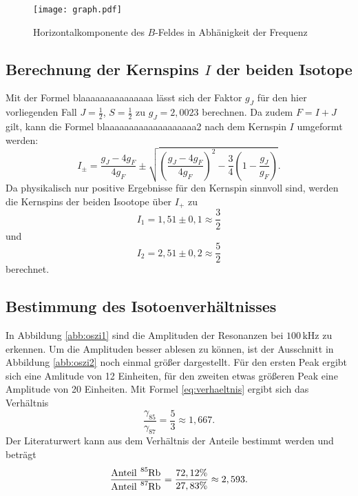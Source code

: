
\begin{figure}[H]
 \centering
 \texttt{[image: graph.pdf]}
 \caption{Horizontalkomponente des $B$-Feldes in Abhänigkeit der Frequenz}
 \label{abb:graph}
\end{figure}

\subsection{Berechnung der Kernspins $I$ der beiden Isotope}
Mit der Formel blaaaaaaaaaaaaaaa lässt sich der Faktor $g_J$ für den hier vorliegenden Fall $J=\frac{1}{2}$, $S=\frac{1}{2}$ zu $g_J=2,0023$ berechnen.
Da zudem $F=I+J$ gilt, kann die Formel blaaaaaaaaaaaaaaaaaaa2 nach dem Kernspin $I$ umgeformt werden:
\begin{equation}
I_\pm=\frac{g_J-4g_F}{4g_F}\pm \sqrt{\left(\frac{g_J-4g_F}{4g_F}\right)^2-\frac{3}{4}\left(1-\frac{g_J}{g_F}\right)}.
\end{equation}
Da physikalisch nur positive Ergebnisse für den Kernspin sinnvoll sind, werden die Kernspins der beiden Isootope über $I_+$ zu
\begin{equation}
I_1=1,51\pm0,1\approx \frac{3}{2}
\end{equation}
und
\begin{equation}
  I_2=2,51\pm0,2\approx \frac{5}{2}
\end{equation}
berechnet.

\subsection{Bestimmung des Isotoenverhältnisses}

In Abbildung \ref{abb:oszi1} sind die Amplituden der Resonanzen bei $100\,\text{kHz}$ zu erkennen. Um die Amplituden besser ablesen zu können, ist der Ausschnitt
in Abbildung \ref{abb:oszi2} noch einmal größer dargestellt. Für den ersten Peak ergibt sich eine Amlitude von 12 Einheiten, für den zweiten etwas größeren
Peak eine Amplitude von 20 Einheiten. Mit Formel \eqref{eq:verhaeltnis} ergibt sich das Verhältnis
\begin{equation}
  \frac{\gamma_{85}}{\gamma_{87}}=\frac{5}{3}\approx 1,667.
\end{equation}
Der Literaturwert kann aus dem Verhältnis\cite{isotop} der Anteile bestimmt werden und beträgt
\begin{equation}
  \frac{\text{Anteil}~ \ce{^{85}Rb}}{\text{Anteil}~ \ce{^{87}Rb}}=\frac{72,12\%}{27,83\%} \approx 2,593.
\end{equation}


